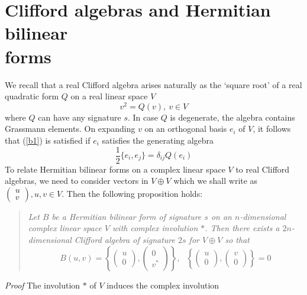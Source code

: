 \documentclass[a4paper,a4paper]{article}
\begin{document}
\section{Clifford algebras and Hermitian bilinear\\forms}
We recall that a real Clifford algebra arises naturally as the `square root' of
a real quadratic form $Q$ on a real linear space $V$ 
\begin{equation} 
v^{2}=Q(v) , \  v \in  V 
\label{b1} 
\end{equation} 
where $Q$ can have any signature $s$. In case $Q$ is degenerate, the algebra
contains Grassmann elements. On expanding $v$ on an orthogonal basis $e_{i}$ of
$V$, it follows that (\ref{b1}) is satisfied if $e_{i}$ satisfies the generating
algebra
\begin{equation} 
\frac{1}{2}\{e_{i},e_{j}\} = \delta _{ij}Q(e_{i})
\label{b2} 
\end{equation} 
To relate Hermitian bilinear forms on a complex linear space $V$ to real
Clifford algebras, we need to consider vectors in $V\oplus V$ which we shall
write as $(\begin{array}{c}u\\v \end{array}), u,v \in V$. Then the following
proposition holds:
\begin{quote}
\emph{Let $B$ be a Hermitian bilinear form of signature $s$ on an
$n$-di\-men\-sion\-al complex linear space $V$ with complex involution $\ast $.
Then there exists a $2n$-dimensional Clifford algebra of signature $2s$ for $V
\oplus V$ so that
\begin{equation} 
B(u,v) = \left \{ \left( \begin{array}{c}u\\0 \end{array} \right),\left(
\begin{array}{c}0\\v^{\ast } \end{array} \right) \right \}, \ \ \ \left \{
\left( \begin{array}{c}u\\0 \end{array} \right),\left(
\begin{array}{c}v\\0 \end{array} \right) \right \}=0
\label{b11}
\end{equation} }
\end{quote}
\emph{Proof} The involution $\ast $ of $V$ induces the complex involution
\end{document}
